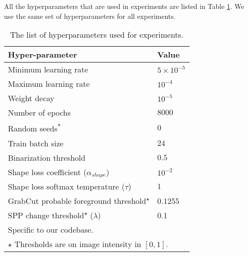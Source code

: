 All the hyperparameters that are used in experiments are listed in Table \ref{tab:hyperparameters}. 
We use the same set of hyperparameters for all experiments.

\begin{table}[H]
    \centering
    \caption{The list of hyperparameters used for experiments.}%
    \label{tab:hyperparameters}
    \begin{tabular}{l l}
        \toprule
        Hyper-parameter & Value \\
        \midrule
        Minimum learning rate & $5 \times 10^{-5}$ \\
        Maximum learning rate & $10^{-4}$ \\
        Weight decay & $10^{-5}$ \\
        Number of epochs & $8000$ \\
        Random seeds\textsuperscript{*} & $0$ \\
        Train batch size & $24$ \\
        Binarization threshold & $0.5$ \\ 
        Shape loss coefficient ($\alpha_{shape}$) & $10^{-2}$ \\
        Shape loss softmax temperature ($\tau$) & $1$ \\
        GrabCut probable foreground threshold\textsuperscript{$\star$} & 0.1255 \\
        SPP change threshold\textsuperscript{$\star$} ($\lambda$) & 0.1 \\
        \bottomrule
        \multicolumn{2}{l}{\small * Specific to our codebase.} \\
        \multicolumn{2}{l}{\small $\star$ Thresholds are on image intensity in $[0, 1]$.}
    \end{tabular}
\end{table}